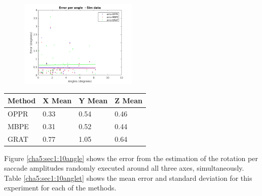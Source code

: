 \begin{figure}[h]
	\centering
	\includegraphics[width=0.5\textwidth]{images/sim/10anglez.png}
	\label{cha5:sec1:10anglez}
\end{figure}
\begin{table}
	\centering
	\begin{tabular}{| l | l | l | l |}
		\hline
		Method & X Mean & Y Mean & Z Mean \\
		\hline
		OPPR &  0.33 \degree & 0.54 \degree & 0.46 \degree \\
		\hline
		MBPE &  0.31 \degree & 0.52 \degree & 0.44 \degree\\
		\hline
		GRAT &  0.77 \degree & 1.05 \degree & 0.64 \degree\\ 
		\hline
	\end{tabular}
	\label{cha5:sec1:10angleaxist}
\end{table}		

Figure \ref{cha5:sec1:10angle} shows the error from the estimation of the rotation per saccade amplitudes randomly executed around all three axes, simultaneously. Table \ref{cha5:sec1:10anglet} shows the mean error and standard deviation for this experiment for each of the methods.\\

